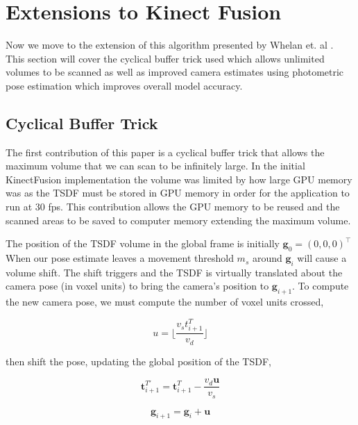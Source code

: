 \documentclass[10pt, twocolumn]{article}
\begin{document}
\section{Extensions to Kinect Fusion}
Now we move to the extension of this algorithm presented by Whelan et. al \cite{whelan14}. This section will cover the cyclical buffer trick used which allows unlimited volumes to be scanned as well as improved camera estimates using photometric pose estimation which improves overall model accuracy.

\subsection{Cyclical Buffer Trick}
The first contribution of this paper is a cyclical buffer trick that allows the maximum volume that we can scan to be infinitely large. In the initial KinectFusion implementation the volume was limited by how large GPU memory was as the TSDF must be stored in GPU memory in order for the application to run at 30 fps. This contribution allows the GPU memory to be reused and the scanned areas to be saved to computer memory extending the maximum volume.

The position of the TSDF volume in the global frame is initially $\mathbf{g}_{0} = (0, 0, 0)^{\top}$
When our pose estimate leaves a movement threshold $m_{s}$ around $\mathbf{g}_{i}$ will cause a volume shift.
The shift triggers and the TSDF is virtually translated about the camera pose (in voxel units) to bring the camera's position to $\mathbf{g}_{i+1}$.
To compute the new camera pose, we must compute the number of voxel units crossed,

\begin{equation}
u = \lfloor \frac{v_{s}t^{T}_{i+1}}{v_d} \rfloor
\end{equation}

then shift the pose, updating the global position of the TSDF,

\begin{equation}
\mathbf{t}^{T'}_{i+1} = \mathbf{t}^{T}_{i+1} - \frac{v_{d}\mathbf{u}}{v_{s}}
\end{equation}

\begin{equation}
\mathbf{g}_{i+1} = \mathbf{g}_{i} + \mathbf{u}
\end{equation}
\end{document}
